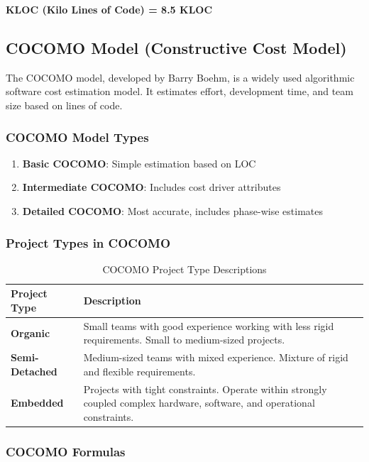 \documentclass[12pt,a4paper]{article}
\begin{document}
\textbf{KLOC (Kilo Lines of Code) = 8.5 KLOC}

\subsection{COCOMO Model (Constructive Cost Model)}

The COCOMO model, developed by Barry Boehm, is a widely used algorithmic software cost estimation model. It estimates effort, development time, and team size based on lines of code.

\subsubsection{COCOMO Model Types}

\begin{enumerate}
    \item \textbf{Basic COCOMO}: Simple estimation based on LOC
    \item \textbf{Intermediate COCOMO}: Includes cost driver attributes
    \item \textbf{Detailed COCOMO}: Most accurate, includes phase-wise estimates
\end{enumerate}

\subsubsection{Project Types in COCOMO}

\begin{table}[H]
\centering
\begin{tabular}{|l|p{10cm}|}
\hline
\textbf{Project Type} & \textbf{Description} \\
\hline
\textbf{Organic} & Small teams with good experience working with less rigid requirements. Small to medium-sized projects. \\
\hline
\textbf{Semi-Detached} & Medium-sized teams with mixed experience. Mixture of rigid and flexible requirements. \\
\hline
\textbf{Embedded} & Projects with tight constraints. Operate within strongly coupled complex hardware, software, and operational constraints. \\
\hline
\end{tabular}
\caption{COCOMO Project Type Descriptions}
\end{table}

\subsubsection{COCOMO Formulas}
\end{document}
